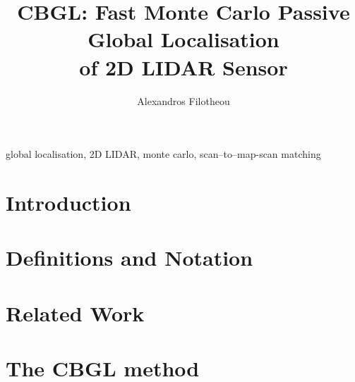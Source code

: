 \documentclass[letterpaper, 10 pt, conference]{ieeeconf}
\begin{document}
\title{\LARGE \bf CBGL: Fast Monte Carlo Passive Global Localisation \\ of 2D LIDAR Sensor}

\author{Alexandros Filotheou}

\maketitle
\thispagestyle{empty}
\pagestyle{empty}

\begin{abstract}
  
\end{abstract}

\begin{keywords}
global localisation, 2D LIDAR, monte carlo, scan--to--map-scan matching
\end{keywords}

\section{Introduction}
  

\section{Definitions and Notation}
  \label{section:definitions}
  

\section{Related Work}
  \label{section:sota}
  

\section{The CBGL method}
  \label{section:the_proposed_method}
  

\end{document}
